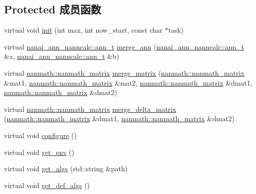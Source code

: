 \subsection*{Protected 成员函数}
\begin{DoxyCompactItemize}
\item 
virtual void \hyperlink{classnanai_1_1nanai__ann__nannmgr_a4ef08a3f12abe6aca1f4cd1e04584512}{init} (int max, int now\+\_\+start, const char $\ast$task)
\item 
virtual \hyperlink{classnanai_1_1nanai__ann__nanncalc_1_1ann__t}{nanai\+\_\+ann\+\_\+nanncalc\+::ann\+\_\+t} \hyperlink{classnanai_1_1nanai__ann__nannmgr_a569b5527d3efd6615b1ed5fe311d3e55}{merge\+\_\+ann} (\hyperlink{classnanai_1_1nanai__ann__nanncalc_1_1ann__t}{nanai\+\_\+ann\+\_\+nanncalc\+::ann\+\_\+t} \&a, \hyperlink{classnanai_1_1nanai__ann__nanncalc_1_1ann__t}{nanai\+\_\+ann\+\_\+nanncalc\+::ann\+\_\+t} \&b)
\item 
virtual \hyperlink{classnanmath_1_1nanmath__matrix}{nanmath\+::nanmath\+\_\+matrix} \hyperlink{classnanai_1_1nanai__ann__nannmgr_a7a9f384ebe727ed9722cbc04e82d30c8}{merge\+\_\+matrix} (\hyperlink{classnanmath_1_1nanmath__matrix}{nanmath\+::nanmath\+\_\+matrix} \&mat1, \hyperlink{classnanmath_1_1nanmath__matrix}{nanmath\+::nanmath\+\_\+matrix} \&mat2, \hyperlink{classnanmath_1_1nanmath__matrix}{nanmath\+::nanmath\+\_\+matrix} \&dmat1, \hyperlink{classnanmath_1_1nanmath__matrix}{nanmath\+::nanmath\+\_\+matrix} \&dmat2)
\item 
virtual \hyperlink{classnanmath_1_1nanmath__matrix}{nanmath\+::nanmath\+\_\+matrix} \hyperlink{classnanai_1_1nanai__ann__nannmgr_a1d9acf82974a0c785349370f40d583af}{merge\+\_\+delta\+\_\+matrix} (\hyperlink{classnanmath_1_1nanmath__matrix}{nanmath\+::nanmath\+\_\+matrix} \&dmat1, \hyperlink{classnanmath_1_1nanmath__matrix}{nanmath\+::nanmath\+\_\+matrix} \&dmat2)
\item 
virtual void \hyperlink{classnanai_1_1nanai__ann__nannmgr_a4097cd6c0d8c9fbd38df08d4474162d7}{configure} ()
\item 
virtual void \hyperlink{classnanai_1_1nanai__ann__nannmgr_a910e51066acc0cefa5a13d441080020a}{get\+\_\+env} ()
\item 
virtual void \hyperlink{classnanai_1_1nanai__ann__nannmgr_af20462056d6628462b18b865197083a5}{get\+\_\+algs} (std\+::string \&path)
\item 
virtual void \hyperlink{classnanai_1_1nanai__ann__nannmgr_a2041f91a11e801557c4e2a310fae4355}{get\+\_\+def\+\_\+algs} ()
\item 

\end{DoxyCompactItemize}
